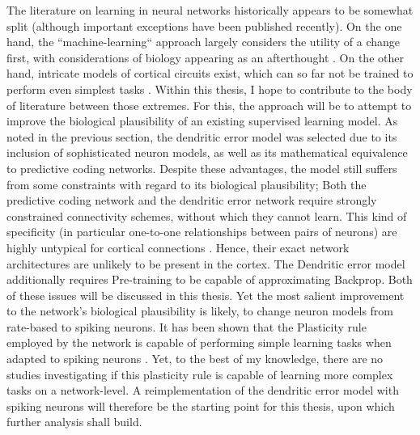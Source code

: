 The literature on learning in neural networks historically appears to be somewhat split (although important exceptions
have been published recently). On the one hand, the ``machine-learning`` approach largely considers the utility of a
change first, with considerations of biology appearing as an afterthought \citep{LeCun2015}. On the other hand,
intricate models of cortical circuits exist, which can so far not be trained to perform even simplest tasks
\citep{potjans2014cell,schmidt2018multi,van2022bringing}. Within this thesis, I hope to contribute to the body of
literature between those extremes. For this, the approach will be to attempt to improve the biological plausibility of
an existing supervised learning model. As noted in the previous section, the dendritic error model
\citep{sacramento2018dendritic} was selected due to its inclusion of sophisticated neuron models, as well as its
mathematical equivalence to predictive coding networks. Despite these advantages, the model still suffers from some
constraints with regard to its biological plausibility; Both the predictive coding network and the dendritic error
network require strongly constrained connectivity schemes, without which they cannot learn. This kind of specificity (in
particular one-to-one relationships between pairs of neurons) are highly untypical for cortical connections
\citep{Thomson2003}. Hence, their exact network architectures are unlikely to be present in the cortex. The Dendritic
error model additionally requires Pre-training to be capable of approximating Backprop. Both of these issues will be
discussed in this thesis. Yet the most salient improvement to the network's biological plausibility is likely, to change
neuron models from rate-based to spiking neurons. It has been shown that the Plasticity rule employed by the network is
capable of performing simple learning tasks when adapted to spiking neurons \citep{Stapmanns2021}. Yet, to the best of
my knowledge, there are no studies investigating if this plasticity rule is capable of learning more complex tasks on a
network-level. A reimplementation of the dendritic error model with spiking neurons will therefore be the starting point
for this thesis, upon which further analysis shall build.